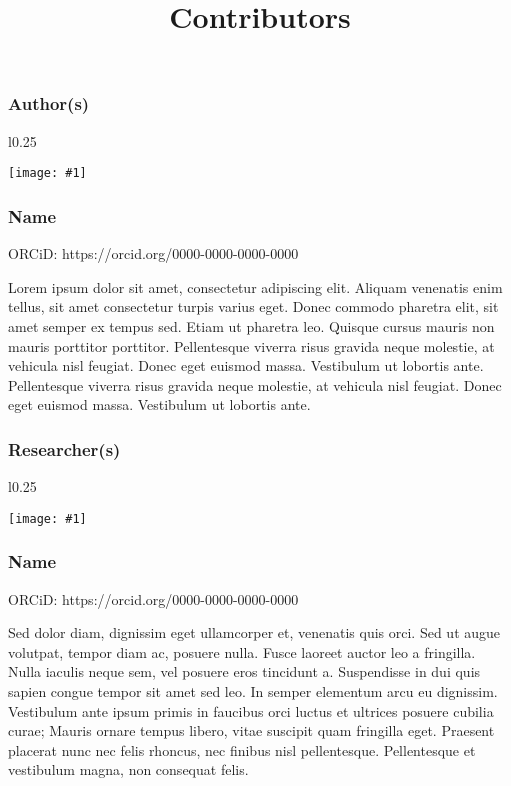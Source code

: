 \documentclass{article}
\newlength{\imgwidth}
\newcommand\scaledgraphics[2]{%
                
\settowidth{\imgwidth}{\texttt{[image: \#1]}}%
                
\setlength{\imgwidth}{\minof{\imgwidth}{#2\textwidth}}%
                
\texttt{[image: \#1]}%
                
}
\begin{document}
\title{Contributors}

\maketitle


\subsubsection{Author(s)}\label{H8801368}


\begin{wrapfigure}{l}{0.25\textwidth}
\scaledgraphics{a5cc1991-6aea-4085-8a89-c66413d92c32.png}{0.25}
\label{F23538191}
\end{wrapfigure}


\subsubsection{Name}\label{H7011072}



ORCiD: https://orcid.org/0000-0000-0000-0000


Lorem ipsum dolor sit amet, consectetur adipiscing elit. Aliquam venenatis enim tellus, sit amet consectetur turpis varius eget. Donec commodo pharetra elit, sit amet semper ex tempus sed. Etiam ut pharetra leo. Quisque cursus mauris non mauris porttitor porttitor. Pellentesque viverra risus gravida neque molestie, at vehicula nisl feugiat. Donec eget euismod massa. Vestibulum ut lobortis ante. Pellentesque viverra risus gravida neque molestie, at vehicula nisl feugiat. Donec eget euismod massa. Vestibulum ut lobortis ante.


\subsubsection{Researcher(s)}\label{H319339}


\begin{wrapfigure}{l}{0.25\textwidth}
\scaledgraphics{138da6a7-fb28-45ef-903e-aa8314b96bae.png}{0.25}
\label{F14184921}
\end{wrapfigure}


\subsubsection{Name}\label{H9896496}



ORCiD: https://orcid.org/0000-0000-0000-0000


Sed dolor diam, dignissim eget ullamcorper et, venenatis quis orci. Sed ut augue volutpat, tempor diam ac, posuere nulla. Fusce laoreet auctor leo a fringilla. Nulla iaculis neque sem, vel posuere eros tincidunt a. Suspendisse in dui quis sapien congue tempor sit amet sed leo. In semper elementum arcu eu dignissim. Vestibulum ante ipsum primis in faucibus orci luctus et ultrices posuere cubilia curae; Mauris ornare tempus libero, vitae suscipit quam fringilla eget. Praesent placerat nunc nec felis rhoncus, nec finibus nisl pellentesque. Pellentesque et vestibulum magna, non consequat felis.
\end{document}

